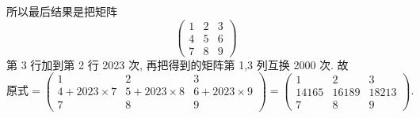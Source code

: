 \documentclass[../../main.tex]{subfiles}
\begin{document}
\begin{solution}
所以最后结果是把矩阵
\[
\begin{pmatrix} 
1 & 2 & 3 \\
4 & 5 & 6 \\
7 & 8 & 9 
\end{pmatrix}
\]
第 3 行加到第 2 行 2023 次, 再把得到的矩阵第 1,3 列互换 2000 次. 故
\[
\text{原式} = \begin{pmatrix} 
1 & 2 & 3 \\
4 + 2023 \times 7 & 5 + 2023 \times 8 & 6 + 2023 \times 9 \\
7 & 8 & 9 
\end{pmatrix} = \begin{pmatrix} 
1 & 2 & 3 \\
14165 & 16189 & 18213 \\
7 & 8 & 9 
\end{pmatrix}.
\]

\end{solution}
\end{document}

